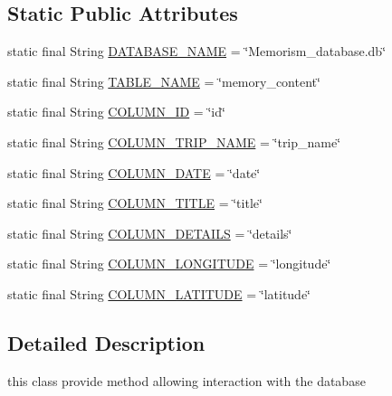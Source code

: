 \subsection*{Static Public Attributes}
\begin{DoxyCompactItemize}
\item 
static final String \hyperlink{classcom_1_1example_1_1memorism_1_1memory_1_1_d_b_helper_a61a19ee13881d07c502373a34687d671}{D\+A\+T\+A\+B\+A\+S\+E\+\_\+\+N\+A\+ME} = \char`\"{}Memorism\+\_\+database.\+db\char`\"{}
\item 
static final String \hyperlink{classcom_1_1example_1_1memorism_1_1memory_1_1_d_b_helper_afb514eee57c4fe21a7c1b7c9c72747a0}{T\+A\+B\+L\+E\+\_\+\+N\+A\+ME} = \char`\"{}memory\+\_\+content\char`\"{}
\item 
static final String \hyperlink{classcom_1_1example_1_1memorism_1_1memory_1_1_d_b_helper_a12593a1ae6e3c03afbc9d108b7c59dff}{C\+O\+L\+U\+M\+N\+\_\+\+ID} = \char`\"{}id\char`\"{}
\item 
static final String \hyperlink{classcom_1_1example_1_1memorism_1_1memory_1_1_d_b_helper_ab557aa558be80f4031b07cdb9afb716d}{C\+O\+L\+U\+M\+N\+\_\+\+T\+R\+I\+P\+\_\+\+N\+A\+ME} = \char`\"{}trip\+\_\+name\char`\"{}
\item 
static final String \hyperlink{classcom_1_1example_1_1memorism_1_1memory_1_1_d_b_helper_a78ff1252868691cc74b9a20b44849ea5}{C\+O\+L\+U\+M\+N\+\_\+\+D\+A\+TE} = \char`\"{}date\char`\"{}
\item 
static final String \hyperlink{classcom_1_1example_1_1memorism_1_1memory_1_1_d_b_helper_ab96886bfdaf0e3551201f4e03f1e4ad0}{C\+O\+L\+U\+M\+N\+\_\+\+T\+I\+T\+LE} = \char`\"{}title\char`\"{}
\item 
static final String \hyperlink{classcom_1_1example_1_1memorism_1_1memory_1_1_d_b_helper_a43bb30fdefc54ee809ff8517fb0cdbfc}{C\+O\+L\+U\+M\+N\+\_\+\+D\+E\+T\+A\+I\+LS} = \char`\"{}details\char`\"{}
\item 
static final String \hyperlink{classcom_1_1example_1_1memorism_1_1memory_1_1_d_b_helper_a853f90958b6e860ffa3fea8c315b7c26}{C\+O\+L\+U\+M\+N\+\_\+\+L\+O\+N\+G\+I\+T\+U\+DE} = \char`\"{}longitude\char`\"{}
\item 
static final String \hyperlink{classcom_1_1example_1_1memorism_1_1memory_1_1_d_b_helper_aef173dee96dd1d3292ed86bc1394fb37}{C\+O\+L\+U\+M\+N\+\_\+\+L\+A\+T\+I\+T\+U\+DE} = \char`\"{}latitude\char`\"{}
\end{DoxyCompactItemize}


\subsection{Detailed Description}
this class provide method allowing interaction with the database 

